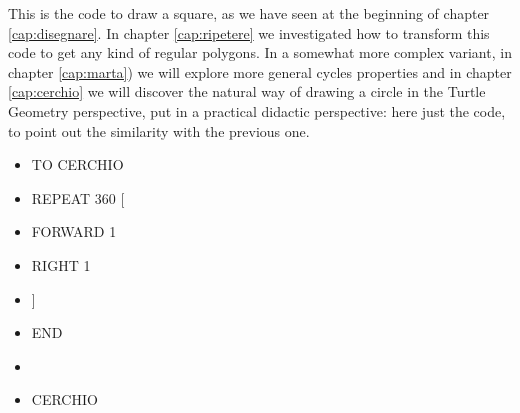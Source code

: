 \vskip 1cm

This is the code to draw a square, as we have seen at the beginning of chapter \ref{cap:disegnare}. In chapter \ref{cap:ripetere} we investigated how to transform this code to get any kind of regular polygons. In a somewhat more complex variant, in chapter \ref{cap:marta}) we will explore more general cycles properties and in chapter \ref{cap:cerchio} we will discover the natural way of drawing a circle in the Turtle Geometry perspective, put in a practical didactic perspective: here just the code, to point out the similarity with the previous one.

\vskip 1cm

\begin{scriptsize}
\begin{minipage}{0.50\textwidth}
\begin{itemize}[itemsep=-3pt,parsep=2pt, leftmargin=-0.0mm ]
\item[] TO CERCHIO                 
\item[] \hspace{8pt} 	REPEAT 360 [ 
\item[] \hspace{8pt}\hspace{8pt}		FORWARD 1 
\item[] \hspace{8pt}\hspace{8pt}		RIGHT 1
\item[] \hspace{8pt}	]
\item[] END                            
\item[] 
\item[] CERCHIO
\end{itemize}
\end{minipage}
\end{scriptsize}

\vskip 1cm

